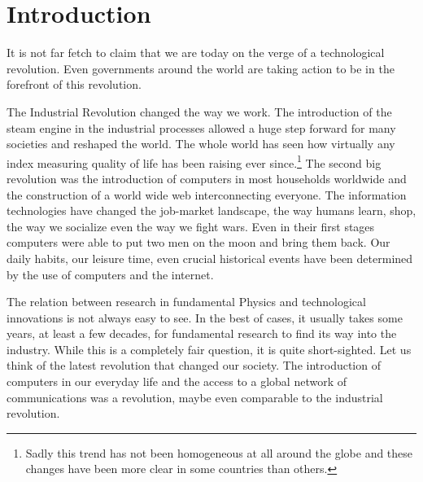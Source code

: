 \chapter{Introduction}
%
%
%
%
It is not far fetch to claim that we are today on the verge of a technological revolution. Even governments around the world are taking action to be in the forefront of this revolution.\cite{QTF}

The Industrial Revolution changed the way we work. The introduction of the steam engine in the industrial processes allowed a huge step forward for many societies and reshaped the world. The whole world has seen how virtually any index measuring quality of life has been raising ever since.\footnote{Sadly this trend has not been homogeneous at all around the globe and these changes have been more clear in some countries than others.}
The second big revolution was the introduction of computers in most households worldwide and the construction of a world wide web interconnecting everyone. The information technologies have changed the job-market landscape, the way humans learn, shop, the way we socialize even the way we fight wars. Even in their first stages computers were able to put two men on the moon and bring them back. Our daily habits, our leisure time, even crucial historical events\cite{Alhindi2012} have been determined by the use of computers and the internet.



The relation between research in fundamental Physics and technological innovations is not always easy to see. In the best of cases, it usually takes some years, at least a few decades, for fundamental research to find its way into the industry.
While this is a completely fair question, it is quite short-sighted. Let us think of the latest revolution that changed our society.
The introduction of computers in our everyday life and the access to a global network of communications was a revolution, maybe even comparable to the industrial revolution.

